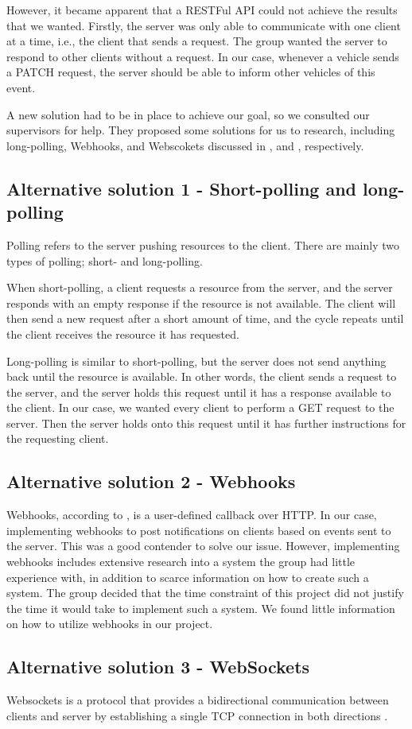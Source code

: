 However, it became apparent that a RESTFul API could not achieve the results that we wanted. Firstly, the server was only able to communicate with one client at a time, i.e., the client that sends a request. The group wanted the server to respond to other clients without a request. In our case, whenever a vehicle sends a PATCH request, the server should be able to inform other vehicles of this event.

A new solution had to be in place to achieve our goal, so we consulted our supervisors for help. They proposed some solutions for us to research, including long-polling, Webhooks, and Webscokets discussed in ,  and , respectively.

\subsection{Alternative solution 1 - Short-polling and long-polling}\label{longpolling}
Polling refers to the server pushing resources to the client. There are mainly two types of polling; short- and long-polling. 

When short-polling, a client requests a resource from the server, and the server responds with an empty response if the resource is not available. The client will then send a new request after a short amount of time, and the cycle repeats until the client receives the resource it has requested.

Long-polling is similar to short-polling, but the server does not send anything back until the resource is available. In other words, the client sends a request to the server, and the server holds this request until it has a response available to the client. In our case, we wanted every client to perform a GET request to the server. Then the server holds onto this request until it has further instructions for the requesting client.

\subsection{Alternative solution 2 - Webhooks}\label{webhooks}
Webhooks, according to \cite{webhooks}, is a user-defined callback over HTTP. In our case, implementing webhooks to post notifications on clients based on events sent to the server. This was a good contender to solve our issue. However, implementing webhooks includes extensive research into a system the group had little experience with, in addition to scarce information on how to create such a system. The group decided that the time constraint of this project did not justify the time it would take to implement such a system. We found little information on how to utilize webhooks in our project.                                                                                                                                                                                                                       

\subsection{Alternative solution 3 - WebSockets}\label{websockets}
Websockets is a protocol that provides a bidirectional communication between clients and server by establishing a single TCP connection in both directions \parencite{rfc_websockets}.  
